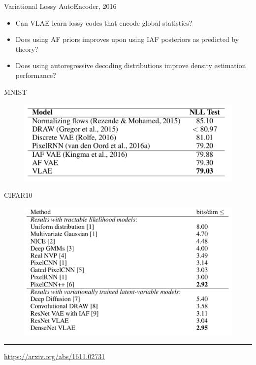\begin{frame}{Variational Lossy AutoEncoder, 2016}
\begin{itemize}
    \item Can VLAE learn lossy codes that encode global statistics?
    \item Does using AF priors improves upon using IAF posteriors as predicted by theory?
    \item Does using autoregressive decoding distributions improve density estimation performance?
\end{itemize}
	\begin{minipage}[t]{0.5\columnwidth}
	\vspace{1cm}
		MNIST
		\begin{figure}[h]
			\centering
			\includegraphics[width=1.\linewidth]{figs/VLAE_1.png}
		\end{figure}
	\end{minipage}%
	\begin{minipage}[t]{0.5\columnwidth}
		CIFAR10
		\begin{figure}[h]
			\centering
			\includegraphics[width=1.\linewidth]{figs/VLAE_2.png}
		\end{figure}
	\end{minipage}
\vfill
\hrule\medskip
{\scriptsize \href{https://arxiv.org/abs/1611.02731}{https://arxiv.org/abs/1611.02731}}
\end{frame}
